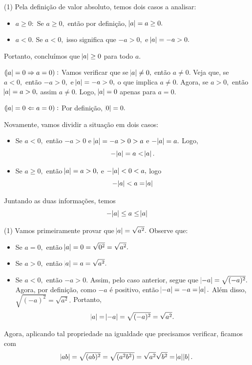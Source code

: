 \documentclass[12pt, a4paper]{article}
\newcommand{\negrito}[1]{\mbox{\boldmath{$#1$}}}
\newcommand{\itens}[1]{\begin{tasks}[label={(tsk[a])},label-width=3.6ex, label-format = {\bfseries}, column-sep = {0pt}](1) #1\end{tasks}}
\newcommand{\alt}[1]{\textcolor{Floresta}{$\negrito{(#1)} $}}
\begin{document}
\begin{solution}
\itens{
\task[\alt{a}] Pela definição de valor absoluto, temos dois casos a analisar:
\begin{itemize}
    \item $a \ge 0:$ Se $a \ge 0,$ então por definição, $\abs{a} = a \ge 0.$
    \item $a < 0.$ Se $a < 0,$ isso significa que $-a > 0,$ e $\abs{a} = -a > 0.$ 
\end{itemize}
Portanto, concluímos que $\abs{a} \ge 0$ para todo $a.$

\task[\alt{b}] $(\abs{a} = 0 \Rightarrow a = 0):$ Vamos verificar que se $\abs{a} \neq 0,$ então $a \neq 0.$ Veja que, se $a < 0,$ então $-a > 0,$ e $\abs{a} = -a > 0,$ o que implica $a \neq 0.$ Agora, se $a > 0,$ então $\abs{a} = a > 0,$ assim $a \neq 0.$ Logo, $\abs{a} = 0$ apenas para $a = 0.$

$(\abs{a} = 0 \Leftarrow a = 0):$ Por definição, $\abs{0} = 0.$
\task[\alt{c}]} Novamente, vamos dividir a situação em dois casos:
\begin{itemize}
    \item Se $a < 0,$ então $-a > 0$ e $\abs{a} = -a > 0 > a$ e $- \abs{a} = a.$ Logo,
    \[
    - \abs{a} = a < \abs{a}.
    \]
    \item Se $a \ge 0,$ então $\abs{a} = a > 0,$ e $- \abs{a} < 0 < a,$ logo
    \[
    -\abs{a} < a = \abs{a}
    \]
\end{itemize}
Juntando as duas informações, temos
\[
- \abs{a} \le a \le \abs{a}
\]
\itens{
\task[\alt{d}] Vamos primeiramente provar que $\abs{a} = \sqrt{a^2}.$ Observe que:
\begin{itemize}
    \item Se $a = 0,$ então $\abs{a} = 0 = \sqrt{0^2} = \sqrt{a^2}.$ 
    \item Se $a > 0,$ então $\abs{a} = a = \sqrt{a^2}.$
    \item Se $a < 0,$ então $-a > 0.$ Assim, pelo caso anterior, segue que $\abs{-a} = \sqrt{(-a)^2}.$ Agora, por definição, como $-a$ é positivo, então $\abs{-a} = -a = \abs{a}.$ Além disso, $\sqrt{(-a)^2} = \sqrt{a^2}.$ Portanto, \[\abs{a} = \abs{-a} = \sqrt{(-a)^2} = \sqrt{a^2}.\]
    \end{itemize}
    Agora, aplicando tal propriedade na igualdade que precisamos verificar, ficamos com
    \[
    \abs{ab} = \sqrt{(ab)^2} = \sqrt{(a^2b^2)} = \sqrt{a^2} \sqrt{b^2} = \abs{a} \abs{b}.
    \]
    
}
\end{solution}
\end{document}
